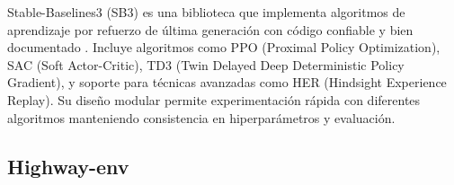 Stable-Baselines3 (SB3) es una biblioteca que implementa algoritmos de aprendizaje por refuerzo de última
generación con código confiable y bien documentado \cite{raffin2021stable}. Incluye algoritmos como
PPO (Proximal Policy Optimization), SAC (Soft Actor-Critic), TD3 (Twin Delayed Deep Deterministic Policy Gradient),
y soporte para técnicas avanzadas como HER (Hindsight Experience Replay). Su diseño modular permite
experimentación rápida con diferentes algoritmos manteniendo consistencia en hiperparámetros y evaluación.


\subsection{Highway-env}\label{subsec:rl-highway-theory}
